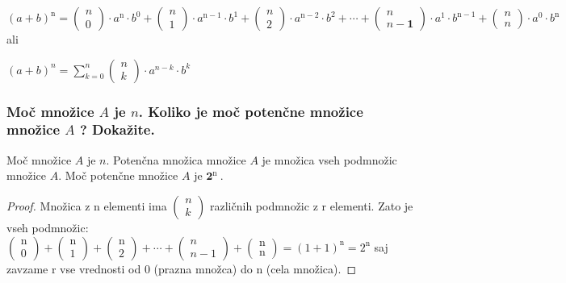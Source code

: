 \documentclass{article}
\begin{document}
$(a+b)^{\mathrm{n}}=\left(\begin{array}{l}n \\ 0\end{array}\right) \cdot a^{\mathrm{n}} \cdot b^{0}+\left(\begin{array}{l}n \\ 1\end{array}\right) \cdot a^{\mathrm{n}-1} \cdot b^{1}+\left(\begin{array}{l}n \\ 2\end{array}\right) \cdot a^{\mathrm{n}-2} \cdot b^{2}+\cdots+\left(\begin{array}{c}n \\ n-\mathbf{1}\end{array}\right) \cdot a^{1} \cdot b^{\mathrm{n}-1}+\left(\begin{array}{l}n \\ n\end{array}\right) \cdot a^{0} \cdot b^{\mathrm{n}}$ ali

$(a+b)^{n}=\sum_{k=0}^{n}\left(\begin{array}{l}n \\ k\end{array}\right) \cdot a^{n-k} \cdot b^{k}$

\subsubsection*{Moč množice $A$ je $n$. Koliko je moč potenčne množice množice $A$ ? Dokažite.}

Moč množice $A$ je $n$. Potenčna množica množice $A$ je množica vseh podmnožic množice $A$. Moč potenčne množice $A$ je $\mathbf{2}^{\text {n }}$.

\begin{proof}
    Množica z n elementi ima $\left(\begin{array}{l}n \\ k\end{array}\right)$ različnih podmnožic z r elementi. Zato je vseh podmnožic: $\left(\begin{array}{l}\mathrm{n} \\ 0\end{array}\right)+\left(\begin{array}{l}\mathrm{n} \\ 1\end{array}\right)+\left(\begin{array}{l}\mathrm{n} \\ 2\end{array}\right)+\cdots+\left(\begin{array}{c}n \\ n-1\end{array}\right)+\left(\begin{array}{l}\mathrm{n} \\ \mathrm{n}\end{array}\right)=(1+1)^{\mathrm{n}}=2^{\mathrm{n}}$ saj zavzame r vse vrednosti od 0 (prazna množca) do n (cela množica).
\end{proof}
\end{document}
